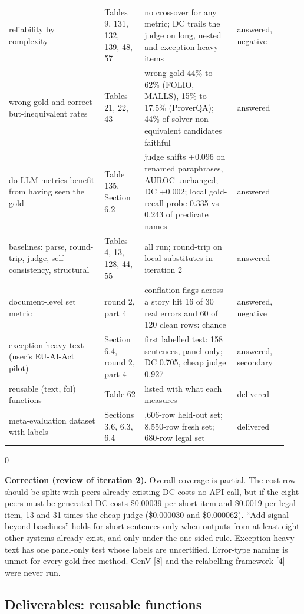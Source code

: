 \documentclass[11pt,letterpaper]{article}
\newenvironment{correction}{\par\medskip\noindent\begin{minipage}{\linewidth}\setlength{\fboxsep}{6pt}\begin{lrbox}{0}\begin{minipage}{0.96\linewidth}\small}{\end{minipage}\end{lrbox}\colorbox{black!6}{\usebox{0}}\end{minipage}\par\medskip}
\begin{document}
{\begin{longtable}{>{\raggedright\arraybackslash}p{0.323\linewidth}>{\raggedright\arraybackslash}p{0.128\linewidth}>{\raggedright\arraybackslash}p{0.310\linewidth}>{\raggedright\arraybackslash}p{0.178\linewidth}}
{}reliability by complexity & Tables 9, 131, 132, 139, 48, 57 & no crossover for any metric; DC trails the judge on long, nested and exception-heavy items & answered, negative \\
{}wrong gold and correct-but-inequivalent rates & Tables 21, 22, 43 & wrong gold 44\% to 62\% (FOLIO, MALLS), 15\% to 17.5\% (ProverQA); 44\% of solver-non-equivalent candidates faithful & answered \\
{}do LLM metrics benefit from having seen the gold & Table 135, Section 6.2 & judge shifts +0.096 on renamed paraphrases, AUROC unchanged; DC +0.002; local gold-recall probe 0.335 vs 0.243 of predicate names & answered \\
{}baselines: parse, round-trip, judge, self-consistency, structural & Tables 4, 13, 128, 44, 55 & all run; round-trip on local substitutes in iteration 2 & answered \\
{}document-level set metric & round 2, part 4 & conflation flags across a story hit 16 of 30 real errors and 60 of 120 clean rows: chance & answered, negative \\
{}exception-heavy text (user's EU-AI-Act pilot) & Section 6.4, round 2, part 4 & first labelled test: 158 sentences, panel only; DC 0.705, cheap judge 0.927 & answered, secondary \\
{}reusable (text, fol) functions & Table 62 & listed with what each measures & delivered \\
{}meta-evaluation dataset with labels & Sections 3.6, 6.3, 6.4 & 15,606-row held-out set; 8,550-row fresh set; 680-row legal set & delivered \\
\end{longtable}
}

\begin{correction}\textbf{Correction (review of iteration 2).} Overall coverage is partial. The cost row should be split: with peers already existing DC costs no API call, but if the eight peers must be generated DC costs \$0.00039 per short item and \$0.0019 per legal item, 13 and 31 times the cheap judge (\$0.000030 and \$0.000062). ``Add signal beyond baselines'' holds for short sentences only when outputs from at least eight other systems already exist, and only under the one-sided rule. Exception-heavy text has one panel-only test whose labels are uncertified. Error-type naming is unmet for every gold-free method. GenV [8] and the relabelling framework [4] were never run.\end{correction}

\subsection{Deliverables: reusable functions}
\end{document}
